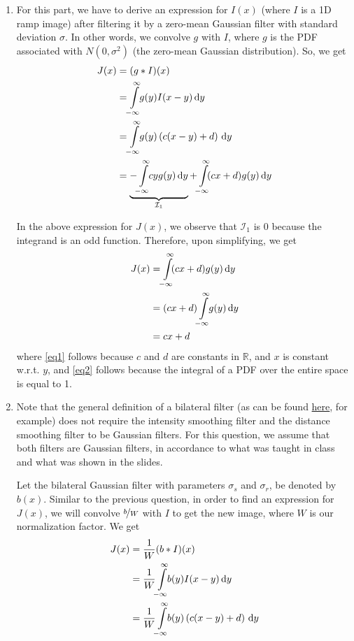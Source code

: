 \documentclass[a4paper]{article}
\newcommand{\R}{\mathbb{R}}
\begin{document}
\begin{enumerate}
\item For this part, we have to derive an expression for $I(x)$ (where $I$ is a 1D ramp image) after filtering it by a zero-mean Gaussian filter with standard deviation $\sigma$. In other words, we convolve $g$ with $I$, where $g$ is the PDF associated with $N(0, \sigma^2)$ (the zero-mean Gaussian distribution). So, we get
\begin{align*}
J(x) &= (g * I)(x) \\
&= \int\limits_{\mathclap{-\infty}}^{\mathclap{\infty}}\! g(y) I (x - y)\, \mathrm{d}y \\
&= \int\limits_{\mathclap{-\infty}}^{\mathclap{\infty}}\! g(y)\left ( c(x - y) + d\right )\, \mathrm{d}y \\
&= \underbrace{-\int\limits_{\mathclap{-\infty}}^{\mathclap{\infty}}\! c y g(y)\, \mathrm{d}y}_{\mathcal{I}_1} + \int\limits_{\mathclap{-\infty}}^{\mathclap{\infty}}\! (cx + d)g(y)\, \mathrm{d}y
\end{align*}

In the above expression for $J(x)$, we observe that $\mathcal{I}_1$ is 0 because the integrand is an odd function. Therefore, upon simplifying, we get
\begin{align}
J(x) &= \int\limits_{\mathclap{-\infty}}^{\mathclap{\infty}}\! (cx + d)g(y)\, \mathrm{d}y \nonumber \\
&=  (cx + d)\int\limits_{\mathclap{-\infty}}^{\mathclap{\infty}}\!g(y)\, \mathrm{d}y \label{eq1} \\
&= cx + d \label{eq2}
\end{align}
where \eqref{eq1} follows because $c$ and $d$ are constants in $\R$, and $x$ is constant w.r.t. $y$, and \eqref{eq2} follows because the integral of a PDF over the entire space is equal to 1.

\item Note that the general definition of a bilateral filter (as can be found \href{https://en.wikipedia.org/wiki/Bilateral_filter#Definition}{here}, for example) does not require the intensity smoothing filter and the distance smoothing filter to be Gaussian filters. For this question, we assume that both filters are Gaussian filters, in accordance to what was taught in class and what was shown in the slides.

Let the bilateral Gaussian filter with parameters $\sigma_s$ and $\sigma_r$, be denoted by $b(x)$. Similar to the previous question, in order to find an expression for $J(x)$, we will convolve $\nicefrac{b}{W}$ with $I$ to get the new image, where $W$ is our normalization factor. We get
\begin{align*}
J(x) &= \dfrac{1}{W}(b * I)(x) \\
&= \dfrac{1}{W}\int\limits_{\mathclap{-\infty}}^{\mathclap{\infty}}\! b(y) I (x - y)\, \mathrm{d}y \\
&= \dfrac{1}{W}\int\limits_{\mathclap{-\infty}}^{\mathclap{\infty}}\! b(y)\left ( c(x - y) + d\right )\, \mathrm{d}y
\end{align*}


\end{enumerate}
\end{document}
